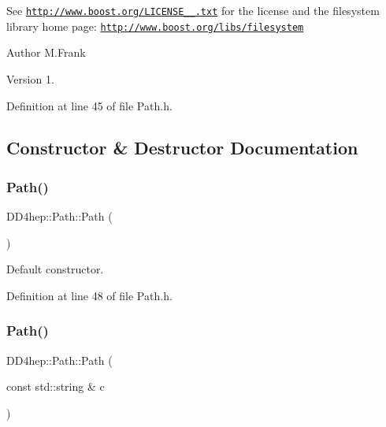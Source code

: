 See \href{http://www.boost.org/LICENSE_1_0.txt}{\tt http\+://www.\+boost.\+org/\+L\+I\+C\+E\+N\+S\+E\+\_\+\_.\+txt} for the license and the filesystem library home page\+: \href{http://www.boost.org/libs/filesystem}{\tt http\+://www.\+boost.\+org/libs/filesystem}

\begin{DoxyAuthor}{Author}
M.\+Frank 
\end{DoxyAuthor}
\begin{DoxyVersion}{Version}
1. 
\end{DoxyVersion}


Definition at line 45 of file Path.\+h.



\subsection{Constructor \& Destructor Documentation}
\hypertarget{class_d_d4hep_1_1_path_a43d8eda2bc0394eca5d44ded6556d434}{}\label{class_d_d4hep_1_1_path_a43d8eda2bc0394eca5d44ded6556d434} 
\subsubsection{\texorpdfstring{Path()}{Path()}\hspace{0.1cm}{\footnotesize\ttfamily [1/4]}}
{\footnotesize\ttfamily D\+D4hep\+::\+Path\+::\+Path (\begin{DoxyParamCaption}{ }\end{DoxyParamCaption})\hspace{0.3cm}{\ttfamily [inline]}}



Default constructor. 



Definition at line 48 of file Path.\+h.

\hypertarget{class_d_d4hep_1_1_path_a29df9b52c07dfecc7015aec057ffe113}{}\label{class_d_d4hep_1_1_path_a29df9b52c07dfecc7015aec057ffe113} 
\subsubsection{\texorpdfstring{Path()}{Path()}\hspace{0.1cm}{\footnotesize\ttfamily [2/4]}}
{\footnotesize\ttfamily D\+D4hep\+::\+Path\+::\+Path (\begin{DoxyParamCaption}\item[{const std\+::string \&}]{c }\end{DoxyParamCaption})\hspace{0.3cm}{\ttfamily [inline]}}



